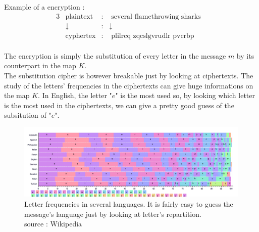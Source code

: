 \begin{table}[ht!]
    \centering
	\caption{Substituion table}
	\label{tab:SubstitionTable}
\end{table}

Example of a encryption : 
\begin{alignat*}{3}
    &\text{plaintext}   & : & \text{ several flamethrowing sharks}&  \\
    & \downarrow        & : &   \downarrow & \\
    &\text{cyphertex}   & : & \text{ plilrcq   zqcslgvrudlr pvcrbp}&  \\ 
\end{alignat*}


The encryption is simply the substitution of every letter in the message $m$ by its counterpart in the map $K$.\\
The substitution cipher is however breakable just by looking at ciphertexts. The study of the letters' frequencies in the ciphertexts can give huge informations on the map $K$. In English, the letter "$e$" is the most used so, by looking which letter is the most used in the ciphertexts, we can give a pretty good guess of the subsitution of "$e$".\\

\begin{figure}[ht!]
    \centering
		\includegraphics[width=\textwidth]{images/letter_frequency}
	\caption{Letter frequencies in several languages. It is fairly easy to guess the message's language just by looking at letter's repartition. \\ source : Wikipedia}
	\label{fig:LetterFrequency}
\end{figure}

